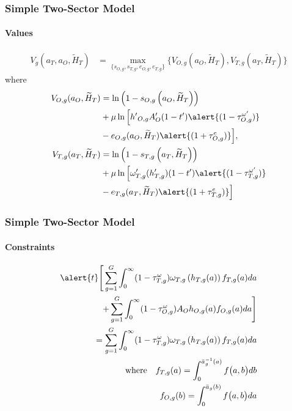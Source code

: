 \documentclass[11pt]{beamer}
\begin{document}
	
	\begin{frame}
		\frametitle{Simple Two-Sector Model}
		\framesubtitle{Values}
		\begin{align*}
			\label{}
			V_g(a_T,a_O,\widetilde{H}_T) & = \max_{\{s_{O,g},s_{T,g},e_{O,g},e_{T,g}\}} \bigg\{ V_{O,g}(a_O,\widetilde{H}_T), V_{T,g}(a_T,\widetilde{H}_T) \bigg\} \label{eq:V}
		\end{align*}
		where
		\begin{align*}
			V_{O,g}(a_O,\widetilde{H}_T) & = \ln\left(1-s_{O,g}\left(a_O,\widetilde{H}_T\right)\right) \nonumber \\
			& + \mu \ln \Big[ {{h'}_{O,g}} A_O'(1-t')\alert{(1-\tau^{\omega '}_{O,g})} \nonumber \\
			& - e_{O,g}(a_O,\widetilde{H}_T)\alert{(1+\tau^e_{O,g})} \Big],\\
			V_{T,g}(a_T,\widetilde{H}_T) & = \ln\left(1-s_{T,g}\left(a_T,\widetilde{H}_T\right)\right) \nonumber \\
			& + \mu \ln \Big[ \omega_{T,g}'({h_{T,g}'})(1-t')\alert{(1-\tau^{\omega '}_{T,g}) }\nonumber \\
			& - e_{T,g}(a_T,\widetilde{H}_T)\alert{(1+\tau^{e }_{T,g})} \Big] 
		\end{align*}
	\end{frame}
	
	\begin{frame}
		\frametitle{Simple Two-Sector Model}
		\framesubtitle{Constraints}
		\begin{align*}
			\alert{t}\Bigg[ \sum_{g=1}^G \int_0^\infty (1-\tau^{\omega}_{T,g})\omega_{T,g}\left(h_{T,g}(a)\right) f_{T,g}(a) da  \\
			+ \sum_{g=1}^G \int_0^\infty (1-\tau^{\omega}_{O,g})A_O h_{O,g}(a) f_{O,g}(a) da \Bigg]\\
			= \sum_{g=1}^G \int_0^\infty (1-\tau^{\omega}_{T,g})\omega_{T,g}\left(h_{T,g}(a)\right) f_{T,g}(a) da \\
			{\rm where } \quad  f_{T,g}(a)  = \int_0^{\bar{a}_g^{-1}\left(a\right)} f\big(a,b \big) db \\
			f_{O,g}(b)  = \int_0^{\bar{a}_g\left(b\right)} f\big(a,b \big) da 
		\end{align*}		
	\end{frame}
\end{document}
